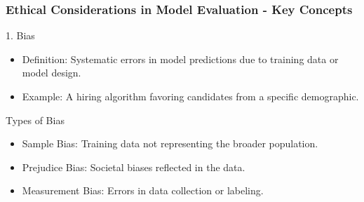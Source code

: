 \documentclass[aspectratio=169]{beamer}
\begin{document}
\begin{frame}[fragile]
    \frametitle{Ethical Considerations in Model Evaluation - Key Concepts}
    \begin{block}{1. Bias}
        \begin{itemize}
            \item Definition: Systematic errors in model predictions due to training data or model design.
            \item Example: A hiring algorithm favoring candidates from a specific demographic.
        \end{itemize}
    \end{block}

    \begin{block}{Types of Bias}
        \begin{itemize}
            \item Sample Bias: Training data not representing the broader population.
            \item Prejudice Bias: Societal biases reflected in the data.
            \item Measurement Bias: Errors in data collection or labeling.
        \end{itemize}
    \end{block}
\end{frame}
\end{document}
